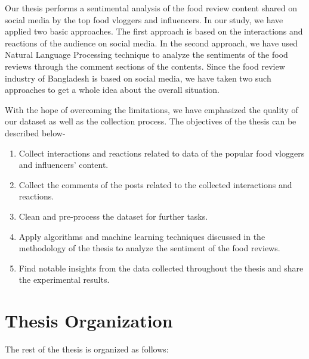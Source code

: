 Our thesis performs a sentimental analysis of the food review content shared on social media by the top food vloggers and influencers. In our study, we have applied two basic approaches. The first approach is based on the interactions and reactions of the audience on social media. In the second approach, we have used Natural Language Processing technique to analyze the sentiments of the food reviews through the comment sections of the contents. Since the food review industry of Bangladesh is based on social media, we have taken two such approaches to get a whole idea about the overall situation.

With the hope of overcoming the limitations, we have emphasized the quality of our dataset as well as the collection process. The objectives of the thesis can be described below-

\begin{enumerate}
    \item {
        Collect interactions and reactions related to data of the popular food vloggers and influencers' content.
    }

    \item {
        Collect the comments of the posts related to the collected interactions and reactions.
    }

    \item {
        Clean and pre-process the dataset for further tasks.
    }
    
    \item {
        Apply algorithms and machine learning techniques discussed in the methodology of the thesis to analyze the sentiment of the food reviews.
    }
    
    \item {
        Find notable insights from the data collected throughout the thesis and share the experimental results.
    }
\end{enumerate}


\section{Thesis Organization}
The rest of the thesis is organized as follows:

